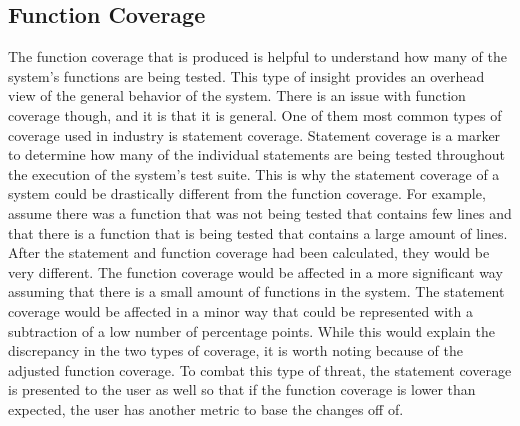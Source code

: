 \subsection{Function Coverage}


The function coverage that is produced is helpful to understand how many of the system's functions are being tested. This type of insight provides an overhead view of the general behavior of the system. There is an issue with function coverage though, and it is that it is general. One of them most common types of coverage used in industry is statement coverage. Statement coverage is a marker to determine how many of the individual statements are being tested throughout the execution of the system's test suite. This is why the statement coverage of a system could be drastically different from the function coverage. For example, assume there was a function that was not being tested that contains few lines and that there is a function that is being tested that contains a large amount of lines. After the statement and function coverage had been calculated, they would be very different. The function coverage would be affected in a more significant way assuming that there is a small amount of functions in the system. The statement coverage would be affected in a minor way that could be represented with a subtraction of a low number of percentage points. While this would explain the discrepancy in the two types of coverage, it is worth noting because of the adjusted function coverage. To combat this type of threat, the statement coverage is presented to the user as well so that if the function coverage is lower than expected, the user has another metric to base the changes off of.

